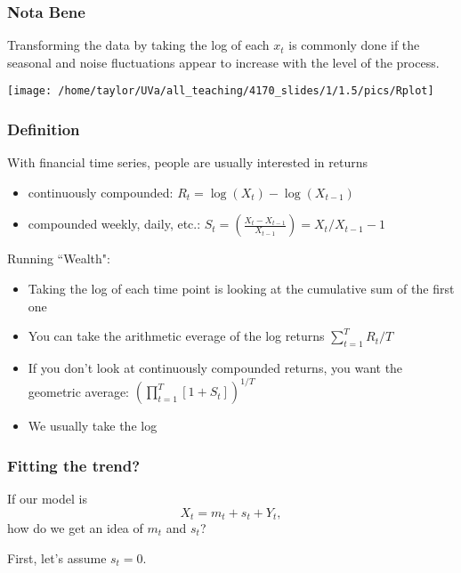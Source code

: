 \documentclass{beamer}
\begin{document}

\begin{frame}
\frametitle{Nota Bene}

Transforming the data by taking the log of each $x_t$ is commonly done if the seasonal and noise
fluctuations appear to increase with the level of the process.

\begin{center}
\texttt{[image: /home/taylor/UVa/all\_teaching/4170\_slides/1/1.5/pics/Rplot]}
\end{center}


\end{frame}


\begin{frame}
\frametitle{Definition}

With financial time series, people are usually interested in returns
\begin{itemize}
\item continuously compounded: $R_t = \log(X_t) - \log(X_{t-1})$
\item compounded weekly, daily, etc.: $S_t = \left( \frac{X_t - X_{t-1} }{X_{t-1}} \right) = X_t/X_{t-1} - 1$
\end{itemize}

Running ``Wealth":
\begin{itemize}
\item Taking the log of each time point is looking at the cumulative sum of the first one
\item You can take the arithmetic everage of the log returns $\sum_{t=1}^T R_t / T$
\item If you don't look at continuously compounded returns, you want the geometric average: $(\prod_{t=1}^T [1+S_t])^{1/T}$
\item We usually take the log 
\end{itemize}

\end{frame}


\begin{frame}
\frametitle{Fitting the trend?}

If our model is 
\[
X_t = m_t + s_t + Y_t,
\]
how do we get an idea of $m_t$ and $s_t$?
\newline

First, let's assume $s_t = 0$.
\end{frame}
\end{document}

